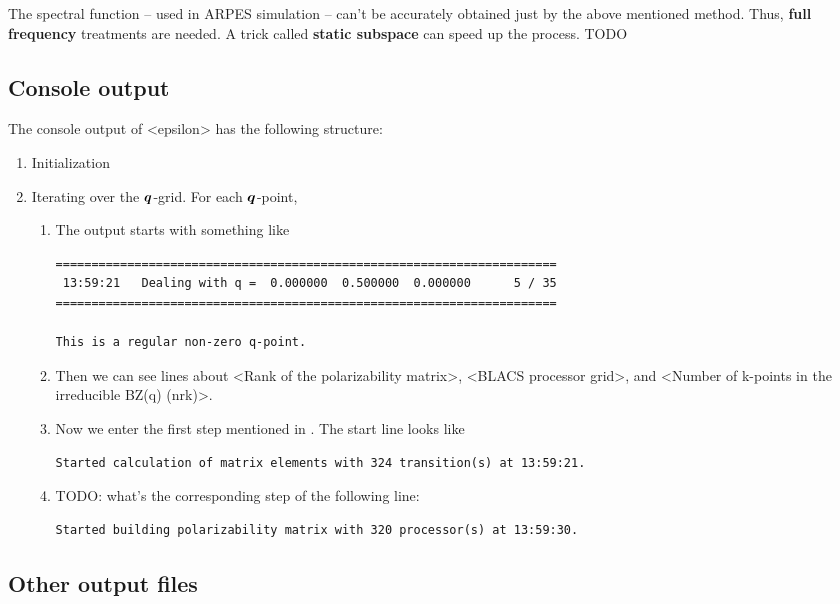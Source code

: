 \documentclass[hyperref, a4paper, 12pt]{report}
\newcommand*{\concept}[1]{{\textbf{#1}}}
\def\texttt#1{<#1>}%
\newcommand{\shortcode}[1]{\texttt{#1}}
\begin{document}
The spectral function -- used in ARPES simulation -- 
can't be accurately obtained just by the above mentioned method.
Thus, \concept{full frequency} treatments are needed.
A trick called \concept{static subspace} can speed up the process. TODO

\subsection{Console output}

The console output of \shortcode{epsilon} has the following structure:
\begin{enumerate}
    \item Initialization
    \item Iterating over the $\vb*{q}$-grid. For each $\vb*{q}$-point,
    \begin{enumerate}
        \item  The output starts with something like
        \begin{lstlisting}
====================================================================== 
 13:59:21   Dealing with q =  0.000000  0.500000  0.000000      5 / 35
======================================================================

This is a regular non-zero q-point.
        \end{lstlisting}
        \item Then we can see lines about 
        \shortcode{Rank of the polarizability matrix},
        \shortcode{BLACS processor grid},
        and \shortcode{Number of k-points in the irreducible BZ(q) (nrk)}.
        \item Now we enter the first step mentioned in .
        The start line looks like
        \begin{lstlisting}
Started calculation of matrix elements with 324 transition(s) at 13:59:21.
        \end{lstlisting}
        \item TODO: what's the corresponding step of the following line:
        \begin{lstlisting}
Started building polarizability matrix with 320 processor(s) at 13:59:30.
        \end{lstlisting}
    \end{enumerate}
\end{enumerate}

\subsection{Other output files}
\end{document}
